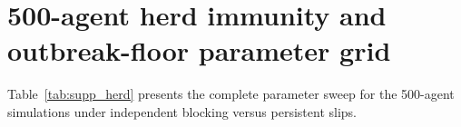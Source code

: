 \documentclass[preprint,12pt,authoryear]{elsarticle}
\begin{document}
\begin{table}[!htbp]
\centering
\caption{Paired partial protection on the 12-agent Barab\'asi--Albert broadcast tree \texttt{ba12} (64 episodes = 704 LLM calls, $n=8$ paired episodes per fraction; Ensemble detector).}
\label{tab:supp_net12b}
\footnotesize
{}
\end{table}

\section{500-agent herd immunity and outbreak-floor parameter grid}
\label{supp:sim500}

Table~\ref{tab:supp_herd} presents the complete parameter sweep for the 500-agent simulations under independent blocking versus persistent slips.
\end{document}
